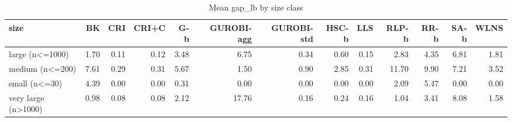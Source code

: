 \begin{table}[htbp]
\centering
\small
\caption{Mean gap\_lb by size class}
\label{tab:E4a_equal_budgets_b10_by_size}
\begin{tabular}{lrrrrrrrrrrrr}
\toprule
size & BK & CRI & CRI+C & G-b & GUROBI-agg & GUROBI-std & HSC-b & LLS & RLP-b & RR-b & SA-b & WLNS \\
\midrule
large (n<=1000) & 1.70 & 0.11 & 0.12 & 3.48 & 6.75 & 0.34 & 0.60 & 0.15 & 2.83 & 4.35 & 6.81 & 1.81 \\
medium (n<=200) & 7.61 & 0.29 & 0.31 & 5.67 & 1.50 & 0.90 & 2.85 & 0.31 & 11.70 & 9.90 & 7.21 & 3.52 \\
small (n<=30) & 4.39 & 0.00 & 0.00 & 0.31 & 0.00 & 0.00 & 0.00 & 0.00 & 2.09 & 5.47 & 0.00 & 0.00 \\
very large (n>1000) & 0.98 & 0.08 & 0.08 & 2.12 & 17.76 & 0.16 & 0.24 & 0.16 & 1.04 & 3.41 & 8.08 & 1.58 \\
\bottomrule
\end{tabular}
\end{table}
